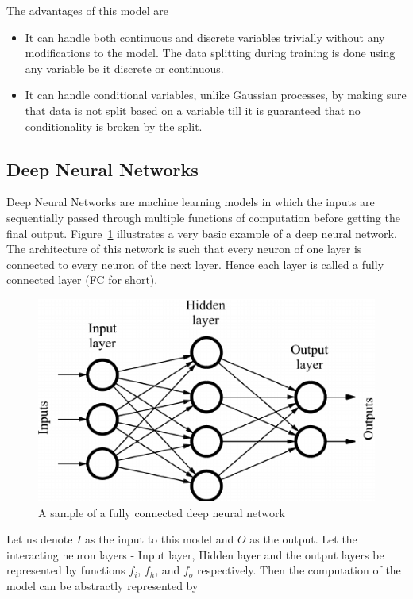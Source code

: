 \documentclass[12pt, twoside, ngerman]{report}
\begin{document}
   The advantages of this model are
   \begin{itemize}
   \item It can handle both continuous and discrete variables trivially without any modifications to the model.
The data splitting during training is done using any variable be it discrete or continuous.
	\item It can handle conditional variables, unlike Gaussian processes, by making sure that data is not split based on a variable till it is guaranteed that no conditionality is broken by the split.
   \end{itemize}

\subsection{Deep Neural Networks}
Deep Neural Networks are machine learning models in which the inputs are sequentially passed through multiple functions of computation before getting the final output.
Figure~\ref{fig:DeepNeuralNetwork} illustrates a very basic example of a deep neural network.
The architecture of this network is such that every neuron of one layer is connected to every neuron of the next layer. 
Hence each layer is called a fully connected layer (FC for short).

\begin{figure}[h]
  \centering
    \includegraphics[scale=0.5]{images/DeepNeuralNetwork}
    \caption{A sample of a fully connected deep neural network~\cite{deepNeuralNetworksImage}}
    \label{fig:DeepNeuralNetwork}
\end{figure}

Let us denote $I$ as the input to this model and $O$ as the output.
Let the interacting neuron layers - Input layer,  Hidden layer and the output layers be represented by functions $f_i$, $f_h$, and $f_o$ respectively.
Then the computation of the model can be abstractly represented by
\end{document}
